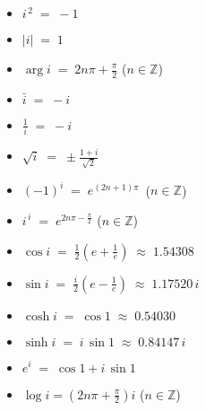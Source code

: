 \documentclass[12pt]{article}
\theoremstyle{definition}
\begin{document}
\begin{itemize}
\item $\displaystyle i^{\,2} \;=\; -1$
\item $|i| \;=\; 1$
\item $\displaystyle\arg{i} \;=\; 2n\pi\!+\!\frac{\pi}{2}$ \quad ($n \in \mathbb{Z}$)
\item $\displaystyle\bar{i} \;=\; -i$
\item $\displaystyle\frac{1}{i} \;=\; -i$
\item $\displaystyle\sqrt{i} \;=\; \pm\frac{1\!+\!i}{\sqrt{2}}$
\item $\displaystyle (-1)^i \;=\; e^{(2n+1)\pi}$\;\, ($n \in \mathbb{Z}$)
\item $\displaystyle i^{\,i} \;=\; e^{2n\pi-\frac{\pi}{2}}$ \quad ($n \in \mathbb{Z}$)
\item $\displaystyle \cos{i} \;=\; \frac{1}{2}\left(e+\frac{1}{e}\right) \;\approx\; 1.54308$
\item $\displaystyle \sin{i} \;=\; \frac{i}{2}\left(e-\frac{1}{e}\right) \;\approx\; 1.17520\,i$
\item $\displaystyle \cosh{i} \;=\; \cos1 \;\approx\; 0.54030$
\item $\displaystyle \sinh{i} \;=\; i\,\sin1 \;\approx\; 0.84147\,i$
\item $\displaystyle e^i \;=\; \cos1+i\,\sin1$
\item $\displaystyle \log{i} = \left(2n\pi\!+\!\frac{\pi}{2}\right)i$ \quad ($n \in \mathbb{Z}$)

\end{itemize}
\end{document}
